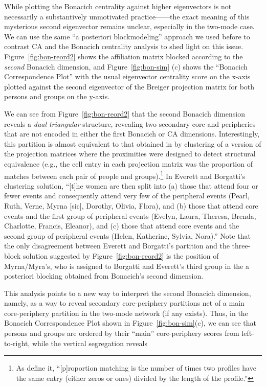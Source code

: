 \documentclass[a4paper,fleqn]{cas-sc}
\begin{document}
While plotting the Bonacich centrality against higher eigenvectors is not necessarily a substantively unmotivated practice---\citep[see][for a discussion in the one-mode network case]{iacobucci2017eigenvector}---the exact meaning of this mysterious second eigenvector remains unclear, especially in the two-mode case. We can use the same ``a posteriori blockmodeling'' \citep{wasserman1990correspondence} approach we used before to contrast CA and the Bonacich centrality analysis to shed light on this issue. Figure~\ref{fig:bon-reord2} shows the affiliation matrix blocked according to the \textit{second} Bonacich dimension, and Figure~\ref{fig:bon-sim} (c) shows the ``Bonacich Correspondence Plot'' with the usual eigenvector centrality score on the x-axis plotted against the second eigenvector of the Breiger projection matrix for both persons and groups on the y-axis. 

We can see from Figure~\ref{fig:bon-reord2} that the second Bonacich dimension reveals a \textit{dual triangular} structure, revealing two secondary core and peripheries that are not encoded in either the first Bonacich or CA dimensions. Interestingly, this partition is almost equivalent to that obtained in \citet[Table 5]{everett2013dual} by clustering of a version of the projection matrices where the proximities were designed to detect structural equivalence (e.g., the cell entry in each projection matrix was the proportion of matches between each pair of people and groups).\footnote{As \citet[208]{everett2013dual} define it, ``[p]roportion matching is the number of times two profiles have the same entry (either zeros or ones) divided by the length of the profile.''} In Everett and Borgatti's \citeyearpar[208]{everett2013dual} clustering solution, ``[t]he women are then split into (a) those that
attend four or fewer events and consequently attend very few of the peripheral events (Pearl, Ruth, Verne, Myrna [sic], Dorothy, Olivia, Flora), and (b) those that attend core events and the first group of peripheral events (Evelyn, Laura, Theresa, Brenda, Charlotte, Francis, Eleanor), and (c) those that attend core events and the second group of peripheral events (Helen, Katherine, Sylvia, Nora).'' Note that the only disagreement between Everett and Borgatti's partition and the three-block solution suggested by Figure~\ref{fig:bon-reord2} is the position of Myrna/Myra's, who is assigned to Borgatti and Everett's third group in the a posteriori blocking obtained from Bonacich's second dimension. 

This analysis points to a new way to interpret the second Bonacich dimension, namely, as a way to reveal secondary core-periphery partitions net of a main core-periphery partition in the two-mode network (if any exists). Thus, in the Bonacich Correspondence Plot shown in Figure~\ref{fig:bon-sim}(c), we can see that persons and groups are ordered by their ``main'' core-periphery scores from left-to-right, while the vertical segregation reveals 
\end{document}
